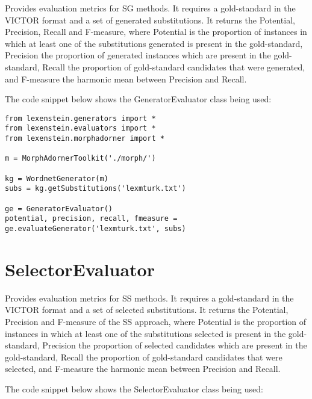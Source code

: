 Provides evaluation metrics for SG methods. It requires a gold-standard in the VICTOR format and a set of generated substitutions. It returns the Potential, Precision, Recall and F-measure, where Potential is the proportion of instances in which at least one of the substitutions generated is present in the gold-standard, Precision the proportion of generated instances which are present in the gold-standard, Recall the proportion of gold-standard candidates that were generated, and F-measure the harmonic mean between Precision and Recall.

The code snippet below shows the GeneratorEvaluator class being used:

\begin{lstlisting}
from lexenstein.generators import *
from lexenstein.evaluators import *
from lexenstein.morphadorner import *

m = MorphAdornerToolkit('./morph/')

kg = WordnetGenerator(m)
subs = kg.getSubstitutions('lexmturk.txt')

ge = GeneratorEvaluator()
potential, precision, recall, fmeasure = ge.evaluateGenerator('lexmturk.txt', subs)
\end{lstlisting}













\section{SelectorEvaluator}

Provides evaluation metrics for SS methods. It requires a gold-standard in the VICTOR format and a set of selected substitutions. It returns the Potential, Precision and F-measure of the SS approach, where Potential is the proportion of instances in which at least one of the substitutions selected is present in the gold-standard, Precision the proportion of selected candidates which are present in the gold-standard, Recall the proportion of gold-standard candidates that were selected, and F-measure the harmonic mean between Precision and Recall.

The code snippet below shows the SelectorEvaluator class being used:

